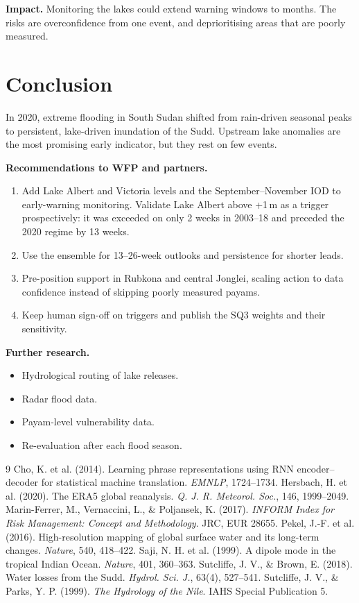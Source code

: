 \documentclass[11pt,a4paper]{article}
\begin{document}
\textbf{Impact.} Monitoring the lakes could extend warning windows to months. The risks are overconfidence from one
event, and deprioritising areas that are poorly measured.

\section{Conclusion}
In 2020, extreme flooding in South Sudan shifted from rain-driven seasonal peaks to persistent, lake-driven inundation
of the Sudd. Upstream lake anomalies are the most promising early indicator, but they rest on few events.

\textbf{Recommendations to WFP and partners.}
\begin{enumerate}\setlength\itemsep{0pt}
\item Add Lake Albert and Victoria levels and the September--November IOD to early-warning monitoring. Validate Lake
Albert above +1\,m as a trigger prospectively: it was exceeded on only 2 weeks in 2003--18 and preceded the 2020
regime by 13 weeks.
\item Use the ensemble for 13--26-week outlooks and persistence for shorter leads.
\item Pre-position support in Rubkona and central Jonglei, scaling action to data confidence instead of skipping
poorly measured payams.
\item Keep human sign-off on triggers and publish the SQ3 weights and their sensitivity.
\end{enumerate}

\textbf{Further research.}
\begin{itemize}\setlength\itemsep{0pt}
\item Hydrological routing of lake releases.
\item Radar flood data.
\item Payam-level vulnerability data.
\item Re-evaluation after each flood season.
\end{itemize}

\small
\begin{thebibliography}{9}\setlength\itemsep{0pt}
 Cho, K. et al. (2014). Learning phrase representations using RNN encoder--decoder for statistical machine translation. \emph{EMNLP}, 1724--1734.
 Hersbach, H. et al. (2020). The ERA5 global reanalysis. \emph{Q. J. R. Meteorol. Soc.}, 146, 1999--2049.
 Marin-Ferrer, M., Vernaccini, L., \& Poljansek, K. (2017). \emph{INFORM Index for Risk Management: Concept and Methodology}. JRC, EUR 28655.
 Pekel, J.-F. et al. (2016). High-resolution mapping of global surface water and its long-term changes. \emph{Nature}, 540, 418--422.
 Saji, N. H. et al. (1999). A dipole mode in the tropical Indian Ocean. \emph{Nature}, 401, 360--363.
 Sutcliffe, J. V., \& Brown, E. (2018). Water losses from the Sudd. \emph{Hydrol. Sci. J.}, 63(4), 527--541.
 Sutcliffe, J. V., \& Parks, Y. P. (1999). \emph{The Hydrology of the Nile}. IAHS Special Publication 5.
\end{thebibliography}
\end{document}
